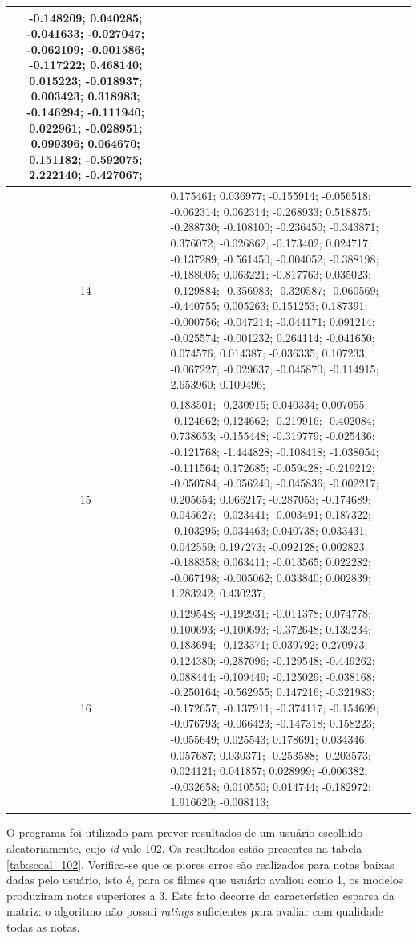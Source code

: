 {\begin{longtable}[h]{| c | p{} |}
	-0.148209; 0.040285; -0.041633; -0.027047; -0.062109; -0.001586; -0.117222;
	0.468140; 0.015223; -0.018937; 0.003423; 0.318983; -0.146294; -0.111940;
	0.022961; -0.028951; 0.099396; 0.064670; 0.151182; -0.592075; 2.222140;
	-0.427067;  \\ \hline
	14 & 0.175461; 0.036977; -0.155914; -0.056518; -0.062314; 0.062314; -0.268933;
	0.518875; -0.288730; -0.108100; -0.236450; -0.343871; 0.376072; -0.026862;
	-0.173402; 0.024717; -0.137289; -0.561450; -0.004052; -0.388198; -0.188005;
	0.063221; -0.817763; 0.035023; -0.129884; -0.356983; -0.320587; -0.060569;
	-0.440755; 0.005263; 0.151253; 0.187391; -0.000756; -0.047214; -0.044171;
	0.091214; -0.025574; -0.001232; 0.264114; -0.041650; 0.074576; 0.014387;
	-0.036335; 0.107233; -0.067227; -0.029637; -0.045870; -0.114915; 2.653960;
	0.109496; \\ \hline
	15 & 0.183501; -0.230915; 0.040334; 0.007055; -0.124662; 0.124662; -0.219916;
	-0.402084; 0.738653; -0.155448; -0.319779; -0.025436; -0.121768; -1.444828;
	-0.108418; -1.038054; -0.111564; 0.172685; -0.059428; -0.219212; -0.050784;
	-0.056240; -0.045836; -0.002217; 0.205654; 0.066217; -0.287053; -0.174689;
	0.045627; -0.023441; -0.003491; 0.187322; -0.103295; 0.034463; 0.040738;
	0.033431; 0.042559; 0.197273; -0.092128; 0.002823; -0.188358; 0.063411;
	-0.013565; 0.022282; -0.067198; -0.005062; 0.033840; 0.002839; 1.283242;
	0.430237;  \\ \hline
	16 & 0.129548; -0.192931; -0.011378; 0.074778; 0.100693; -0.100693; -0.372648;
	0.139234; 0.183694; -0.123371; 0.039792; 0.270973; 0.124380; -0.287096;
	-0.129548; -0.449262; 0.088444; -0.109449; -0.125029; -0.038168; -0.250164;
	-0.562955; 0.147216; -0.321983; -0.172657; -0.137911; -0.374117; -0.154699;
	-0.076793; -0.066423; -0.147318; 0.158223; -0.055649; 0.025543; 0.178691;
	0.034346; 0.057687; 0.030371; -0.253588; -0.203573; 0.024121; 0.041857;
	0.028999; -0.006382; -0.032658; 0.010550; 0.014744; -0.182972; 1.916620;
	-0.008113; \\ \hline
			    
	\end{longtable} }

\FloatBarrier


O programa foi utilizado para prever resultados de um usuário
escolhido aleatoriamente, cujo \textit{id} vale 102. Os resultados estão
presentes na tabela \ref{tab:scoal_102}. Verifica-se que os piores erros são
realizados para notas baixas dadas pelo usuário, isto é, para os filmes que
usuário avaliou como 1, os modelos produziram notas superiores a 3. Este fato
decorre da característica esparsa da matriz: o algoritmo não possui
\textit{ratings} suficientes para avaliar com qualidade todas as notas.

